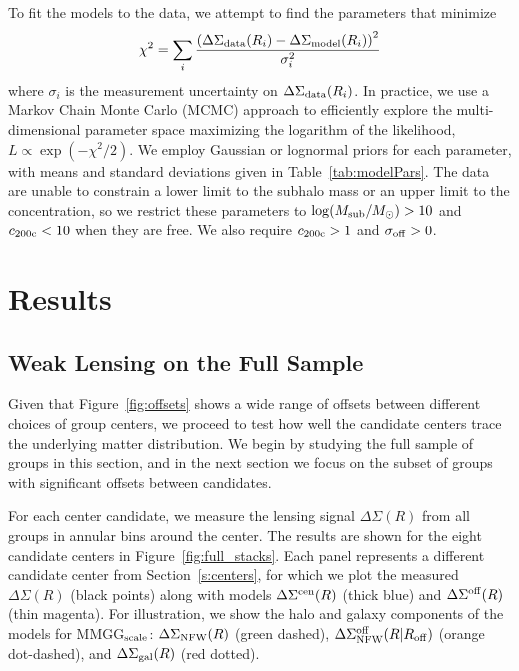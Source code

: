 \documentclass[12pt]{emulateapj}
\begin{document}
To fit the models to the data, we attempt to find the
  parameters that minimize
\begin{equation}
\chi^2=\sum_i \frac{\left(\Delta\Sigma_{\rm data}(R_i)-\Delta\Sigma_{\rm model}(R_i)\right)^2}{\sigma_i^2}
\end{equation}
where $\sigma_i$ is the measurement uncertainty on
  $\Delta\Sigma_{\rm data}(R_i)$. In practice, we use a Markov Chain
  Monte Carlo (MCMC) approach to efficiently explore the multi-dimensional
  parameter space maximizing the logarithm of the likelihood,
  $L\propto\exp(-\chi^2/2)$. We employ Gaussian or lognormal priors for each
  parameter, with means and standard deviations given in
  Table~\ref{tab:modelPars}. The data are unable to constrain a lower
  limit to the subhalo mass or an upper limit to the concentration, so we restrict these
parameters to $\log(M_{\rm sub}/M_{\odot})>10$ and $c_{\rm
  200c}<10$ when they are free. We also require $c_{\rm 200c}>1$ and $\sigma_{\rm
  off}>0$.



\section{Results}
\label{s:results}

\subsection{Weak Lensing on the Full Sample}
\label{s:comparing_cen}

Given that Figure~\ref{fig:offsets} shows a wide range of
offsets between different choices of group centers, we proceed
to test how well the candidate centers trace the underlying matter
distribution. We begin by studying the full sample of groups in this
section, and in the next section we focus on the subset of groups with significant
offsets between candidates. 

For each center candidate, we measure the lensing signal
$\Delta\Sigma(R)$ from all groups in annular bins around the center.
The results are shown for the eight candidate centers in
Figure~\ref{fig:full_stacks}. Each panel represents a different
candidate center from Section~\ref{s:centers}, for which we plot the
measured $\Delta\Sigma(R)$ (black points) along with models
$\Delta\Sigma^{\rm cen}(R)$ (thick blue) and $\Delta\Sigma^{\rm
  off}(R)$ (thin magenta). For illustration, we show the halo and
galaxy components of the models for MMGG$_{\rm scale}$:
$\Delta\Sigma_{\rm NFW}(R)$ (green dashed), $\Delta\Sigma_{\rm
  NFW}^{\rm off}(R|R_{\rm off})$ (orange dot-dashed), and
$\Delta\Sigma_{\rm gal}(R)$ (red dotted). 
\end{document}

